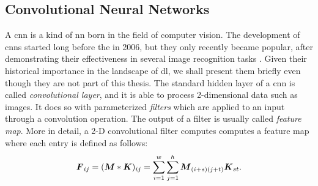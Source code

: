 \subsection{Convolutional Neural Networks}
A \gls{cnn} \citep{lecun1995convolutionalnn} is a kind of \gls{nn} born in the field of computer vision. The development of \glspl{cnn} started long before the  in 2006, but they only recently became popular, after demonstrating their effectiveness in several image recognition tasks \citep{krizhevsky2017imagenet}. Given their historical importance in the landscape of \gls{dl}, we shall present them briefly even though they are not part of this thesis. The standard hidden layer of a \gls{cnn} is called \emph{convolutional layer}, and it is able to process 2-dimensional data such as images. It does so with parameterized \emph{filters} which are applied to an input through a convolution operation. The output of a filter is usually called \emph{feature map}. More in detail, a 2-D convolutional filter computes computes a feature map where each entry is defined as follows:
$$\Matrix{F}_{ij} = (\Matrix{M} * \Matrix{K})_{ij} = \sum_{i=1}^{w} \sum_{j=1}^{h} \Matrix{M}_{(i+s)(j+t)}\Matrix{K}_{st}.$$
